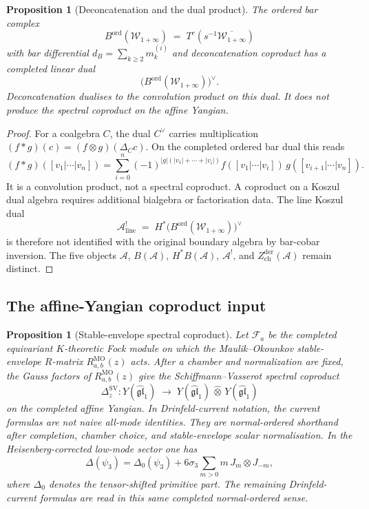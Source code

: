 \documentclass[11pt]{article}
\newtheorem{proposition}[theorem]{Proposition}
\theoremstyle{remark}
\providecommand{\cA}{\mathcal{A}}
\providecommand{\fgl}{\mathfrak{gl}}
\begin{document}
\begin{proposition}[Deconcatenation and the dual product]
\label{constr:beta}
The ordered bar complex
\[
B^{\mathrm{ord}}(\mathcal{W}_{1+\infty})
\;=\;
T^c(s^{-1}\overline{\mathcal{W}_{1+\infty}})
\]
with bar differential $d_B = \sum_{k \ge 2} m_k^{(i)}$ and
deconcatenation coproduct has a completed linear dual
\[
\bigl(B^{\mathrm{ord}}(\mathcal{W}_{1+\infty})\bigr)^\vee.
\]
Deconcatenation dualises to the convolution product on this dual.  It
does not produce the spectral coproduct on the affine Yangian.
\end{proposition}

\begin{proof}
For a coalgebra $C$, the dual $C^\vee$ carries multiplication
$(f*g)(c)=(f\otimes g)(\Delta_Cc)$.  On the completed ordered bar dual
this reads
\[
 (f*g)([v_1|\cdots|v_n])
 =
 \sum_{i=0}^n
 (-1)^{|g|(|v_1|+\cdots+|v_i|)}
 f([v_1|\cdots|v_i])\,g([v_{i+1}|\cdots|v_n]).
\]
It is a convolution product, not a spectral coproduct.  A coproduct on
a Koszul dual algebra requires additional bialgebra or factorisation
data.  The line
Koszul dual
\[
\cA^!_{\mathrm{line}}
\;=\;
H^*\bigl(B^{\mathrm{ord}}(\mathcal{W}_{1+\infty})\bigr)^\vee
\]
is therefore not identified with the original boundary algebra by
bar-cobar inversion.  The five objects
$\cA$, $B(\cA)$, $H^\ast B(\cA)$, $\cA^!$, and
$Z^{\mathrm{der}}_{\mathrm{ch}}(\cA)$ remain distinct.
\end{proof}

\subsection*{The affine-Yangian coproduct input}

\begin{proposition}[Stable-envelope spectral coproduct]
\label{prop:gamma-inverse}
Let $\mathcal F_a$ be the completed equivariant $K$-theoretic Fock
module on which the Maulik--Okounkov stable-envelope $R$-matrix
$R^{\mathrm{MO}}_{a,b}(z)$ acts.  After a chamber and normalization
are fixed, the Gauss factors of $R^{\mathrm{MO}}_{a,b}(z)$ give the
Schiffmann--Vasserot spectral coproduct
\begin{equation}\label{eq:gamma-coprod}
\Delta_z^{\mathrm{SV}} \colon
Y(\widehat{\fgl}_1)
\;\longrightarrow\;
Y(\widehat{\fgl}_1) \,\widehat{\otimes}\,
Y(\widehat{\fgl}_1)
\end{equation}
on the completed affine Yangian.  In Drinfeld-current notation,
the current formulas are not naive all-mode identities.  They are
normal-ordered shorthand after completion, chamber choice, and
stable-envelope scalar normalisation.  In the Heisenberg-corrected
low-mode sector one has
\[
  \Delta(\psi_3)
  =
  \Delta_0(\psi_3)
  +6\sigma_3\sum_{m>0}m\,J_m\otimes J_{-m},
\]
where $\Delta_0$ denotes the tensor-shifted primitive part.  The
remaining Drinfeld-current formulas are read in this same completed
normal-ordered sense.
\end{proposition}
\end{document}
